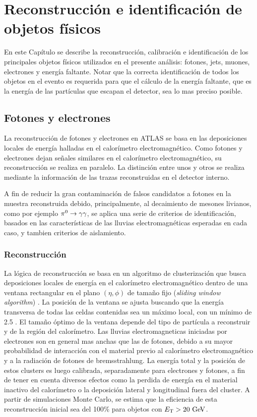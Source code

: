 \chapter{Reconstrucción e identificación de objetos físicos}
\label{cap:objetos}

En este Capítulo se describe la reconstrucción, calibración e identificación de
los principales objetos físicos utilizados en el presente análisis: fotones,
jets, muones, electrones y energía faltante. Notar que la correcta
identificación de todos los objetos en el evento es requerida para que el
cálculo de la energía faltante, que es la energía de las partículas que escapan
el detector, sea lo mas preciso posible.



\section{Fotones y electrones}
\label{sec:obj_photons}

La reconstrucción de fotones y electrones en ATLAS se basa en las deposiciones
locales de energía halladas en el calorímetro electromagnético. Como fotones y
electrones dejan señales similares en el calorímetro electromagnético, su
reconstrucción se realiza en paralelo. La distinción entre unos y otros se
realiza mediante la información de las trazas reconstruidas en el detector
interno.

A fin de reducir la gran contaminación de falsos candidatos a fotones en la
muestra reconstruida debido, principalmente, al decaimiento de mesones livianos,
como por ejemplo $\pi^0 \to \gam\gam$, se aplica una serie de criterios de
identificación, basados en las características de las lluvias electromagnéticas
esperadas en cada caso, y tambien criterios de aislamiento.


\subsection{Reconstrucción}

La lógica de reconstrucción se basa en un algoritmo de clusterización que busca
deposiciones locales de energía en el calorímetro electromagnético dentro de una
ventana rectangular en el plano $(\eta, \phi)$ de tamaño fijo (\emph{sliding
  window algorithm}) \cite{Delmastro:1747242}. La posición de la ventana se
ajusta buscando que la energía transversa de todas las celdas contenidas sea un
máximo local, con un mínimo de 2.5 \gev. El tamaño óptimo de la ventana depende
del tipo de partícula a reconstruir y de la región del calorímetro. Las lluvias
electromagneticas iniciadas por electrones son en general mas anchas que las de
fotones, debido a su mayor probabilidad de interacción con el material previo al
calorímetro electromagnético y a la radiación de fotones de bremsstrahlung. La
energía total y la posición de estos clusters es luego calibrada, separadamente
para electrones y fotones, a fin de tener en cuenta diversos efectos como la
perdida de energía en el material inactivo del calorímetro o la deposición
lateral y longitudinal fuera del cluster. A partir de simulaciones Monte Carlo,
se estima que la eficiencia de esta reconstrucción inicial sea del 100\% para
objetos con $\et > 20 \gev$.

